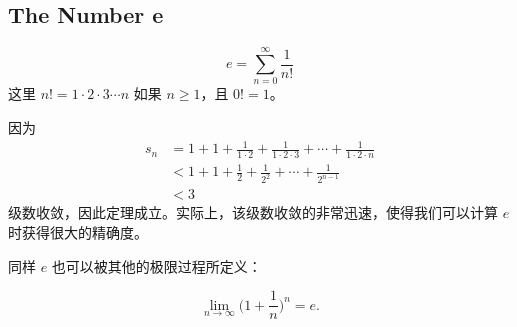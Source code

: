 \documentclass[../poma-notes.tex]{subfiles}
\begin{document}
\subsection*{The Number e}

\begin{definition}
  \[ e = \sum_{n=0}^{\infty} \frac{1}{n!} \]
  这里 $n! = 1 \cdot 2 \cdot 3 \cdots n$ 如果 $n \ge 1$，且 $0! = 1$。

  因为
  \begin{align*}
    \mathcal{} s_n & = 1 + 1 + \frac{1}{1 \cdot 2} + \frac{1}{1 \cdot 2 \cdot 3} + \cdots + \frac{1}{1 \cdot 2 \cdot n} \\
                   & < 1 + 1 + \frac{1}{2} + \frac{1}{2^2} +  \cdots + \frac{1}{2^{n-1}}                                \\
                   & < 3
  \end{align*}
  级数收敛，因此定理成立。实际上，该级数收敛的非常迅速，使得我们可以计算 $e$ 时获得很大的精确度。
\end{definition}

同样 $e$ 也可以被其他的极限过程所定义：

\begin{theorem}
  \[ \lim_{n \to \infty} \Biggl( 1 + \frac{1}{n} \Biggr)^n = e. \]
\end{theorem}
\end{document}
